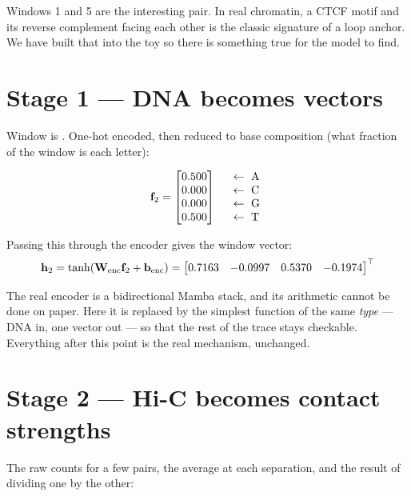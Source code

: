 \documentclass[11pt,a4paper]{article}
\newcommand{\hvec}[1]{\mathbf{h}_{#1}}
\newcommand{\code}[1]{\texttt{\small #1}}
\begin{document}
Windows 1 and 5 are the interesting pair. In real chromatin, a CTCF motif and its
reverse complement facing each other is the classic signature of a loop anchor.
We have built that into the toy so there is something true for the model to find.

\section{Stage 1 --- DNA becomes vectors}

Window \WEfocus{} is \code{\WEdnaTwo}. One-hot encoded, then reduced to base
composition (what fraction of the window is each letter):

\[
\mathbf{f}_{2} =
\begin{bmatrix} 0.500 \\ 0.000 \\ 0.000 \\ 0.500 \end{bmatrix}
\quad
\begin{array}{l}
\leftarrow\ \text{A} \\ \leftarrow\ \text{C} \\ \leftarrow\ \text{G} \\ \leftarrow\ \text{T}
\end{array}
\]

Passing this through the encoder gives the window vector:
\[
\hvec{\WEfocus} = \tanh(\mathbf{W}_{\text{enc}} \mathbf{f}_{\WEfocus} + \mathbf{b}_{\text{enc}})
= \begin{bmatrix} \WEhTwoZero & \WEhTwoOne & \WEhTwoTwo & \WEhTwoThree \end{bmatrix}^\top
\]

\begin{carefulbox}
The real encoder is a bidirectional Mamba stack, and its arithmetic cannot be
done on paper. Here it is replaced by the simplest function of the same
\emph{type} --- DNA in, one vector out --- so that the rest of the trace stays
checkable. Everything after this point is the real mechanism, unchanged.
\end{carefulbox}

\section{Stage 2 --- Hi-C becomes contact strengths}

The raw counts for a few pairs, the average at each separation, and the result of
dividing one by the other:
\end{document}
